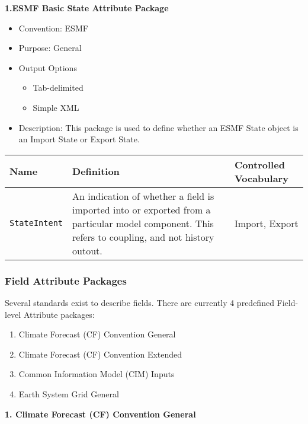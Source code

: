 \vspace{.20in}
{\bf 1.ESMF Basic State Attribute Package}

\begin{itemize}
    \item Convention: ESMF
    \item Purpose: General
    \item Output Options
    \begin{itemize}
        \item Tab-delimited
        \item Simple XML 
    \end{itemize}
    \item Description: This package is used to define whether an ESMF State object is an Import State or Export State.   
\end{itemize}

\begin{tabular}{|p{8cm}|p{20cm}|p{10cm}|}
    {\bf Name } & {\bf Definition} & {\bf Controlled Vocabulary} \\
    \hline\hline
    {\tt StateIntent} & An indication of whether a field is imported into or exported from a particular model component. This refers to coupling, and not history outout. & Import, Export \\
\end{tabular}


\vspace{.20in}
\subsubsection{Field Attribute Packages}
\label{FieldAttributePackages}

Several standards exist to describe fields. There are currently 4 predefined Field-level Attribute packages:

\begin{enumerate}
    \item Climate Forecast (CF) Convention General
    \item Climate Forecast (CF) Convention Extended
    \item Common Information Model (CIM) Inputs
    \item Earth System Grid General

\end{enumerate}

\vspace{.20in}
{\bf 1. Climate Forecast (CF) Convention General}

